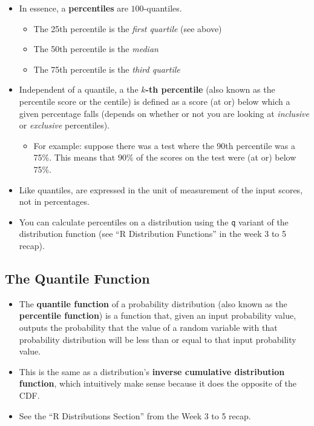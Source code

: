 \documentclass[12pt]{article}
\begin{document}
\begin{itemize}
	\item In essence, a \textbf{percentiles} are $100$-quantiles.
	      \begin{itemize}
		      \item The 25th percentile is the \emph{first quartile} (see above)
		      \item The 50th percentile is the \emph{median}
		      \item The 75th percentile is the \emph{third quartile}
	      \end{itemize}
	\item Independent of a quantile, a the \textbf{$k$-th percentile} (also
	      known as the percentile score or the centile) is defined as a score (at
	      or) below which a given percentage falls (depends on whether or not you
	      are looking at \emph{inclusive} or \emph{exclusive} percentiles).
	      \begin{itemize}
		      \item For example: suppose there was a test where the $90$th
		            percentile was a 75\%. This means that $90\%$ of the scores
		            on the test were (at or) below 75\%.
	      \end{itemize}
	\item Like quantiles, are expressed in the unit of measurement of the
	      input scores, not in percentages.
	\item You can calculate percentiles on a distribution using the
	      \verb|q| variant of the distribution function (see ``R
	      Distribution Functions'' in the week 3 to 5 recap).
\end{itemize}

\subsection*{The Quantile Function}

\begin{itemize}
	\item The \textbf{quantile function} of a probability distribution (also
	      known as the \textbf{percentile function}) is a function that, given
	      an input probability value, outputs the probability that the value of
	      a random variable with that probability distribution will be less than
	      or equal to that input probability value.
	\item This is the same as a distribution's \textbf{inverse cumulative
		      distribution function}, which intuitively make sense because
	      it does the opposite of the CDF.
	\item See the ``R Distributions Section'' from the Week 3 to 5 recap.
\end{itemize}
\end{document}
